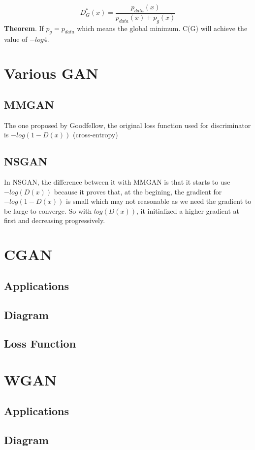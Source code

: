 \documentclass{article}
\begin{document}
\begin{equation}
\label{1.1}
D^{*}_{G}(x)=\frac{p_{data}(x)}{p_{data}(x)+p_g(x)} 
\end{equation}
\textbf{Theorem}. If \(p_{g}=p_{data}\) which means the global minimum. C(G) will achieve the value of $-log4$.

\section{Various GAN}
\subsection{MMGAN}
The one proposed by Goodfellow, the original loss function used for
 discriminator is $-log(1- D(x))$ (cross-entropy)

\subsection{NSGAN}
In NSGAN, the difference between it with MMGAN is that it starts to use $-log(D(x))$ because it proves that, at the begining, the gradient for $-log(1-D(x))$ is small which may not reasonable as we need the gradient to be large to converge. So with $log(D(x))$, it initialized a higher gradient at first and decreasing progressively.

\section{CGAN}
\subsection{Applications}
\subsection{Diagram}
\subsection{Loss Function}

\section{WGAN}
\subsection{Applications}

\subsection{Diagram}
\end{document}
